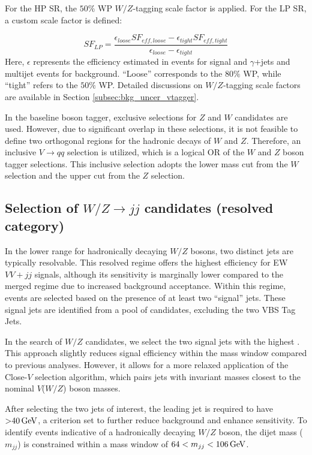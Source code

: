 For the HP SR, the $50\%$ WP $W/Z$-tagging scale factor is applied. For the LP SR, a custom scale factor is defined:

    \begin{equation}
    SF_{LP} = \frac{\epsilon_{loose}SF_{eff,loose}- \epsilon_{tight}SF_{eff,tight} }{ \epsilon_{loose}- \epsilon_{tight}}
    \end{equation}
Here, $\epsilon$ represents the efficiency estimated in \ttbar events for signal and $\gamma$+jets and multijet events for background.
``Loose'' corresponds to the $80\%$ WP, while ``tight'' refers to the $50\%$ WP. Detailed discussions on $W/Z$-tagging scale factors are available in Section \ref{subsec:bkg_uncer_vtagger}.

In the baseline boson tagger, exclusive selections for $Z$ and $W$ candidates are used. However, due to significant overlap in these selections, it is not feasible to define two orthogonal regions for the hadronic decays of $W$ and $Z$. Therefore, an inclusive $V \to qq$ selection is utilized, which is a logical OR of the $W$ and $Z$ boson tagger selections. This inclusive selection adopts the lower mass cut from the $W$ selection and the upper cut from the $Z$ selection.


\subsection{Selection of $W/Z \to jj$ candidates (resolved category)}
\label{subsubsec:resolved_jets_selection}

In the lower \pt range for hadronically decaying $W/Z$ bosons, two distinct jets are typically resolvable. This resolved regime offers the highest efficiency for EW $VV+jj$ signals, although its sensitivity is marginally lower compared to the merged regime due to increased background acceptance.
Within this regime, events are selected based on the presence of at least two ``signal'' jets. These signal jets are identified from a pool of candidates, excluding the two VBS Tag Jets.

In the search of $W/Z$ candidates, we select the two signal jets with the highest \pt. This approach slightly reduces signal efficiency within the mass window compared to previous analyses. However, it allows for a more relaxed application of the Close-$V$ selection algorithm, which pairs jets with invariant masses closest to the nominal $V$($W/Z$) boson masses. 

After selecting the two jets of interest, the leading jet is required to have \pt $\SI{>40}{\GeV}$, a criterion set to further reduce background and enhance sensitivity. To identify events indicative of a hadronically decaying $W/Z$ boson, the dijet mass ($m_{jj}$) is constrained within a mass window of $64 <m_{jj}<106\,\text{Ge\kern -0.1em V}$.

